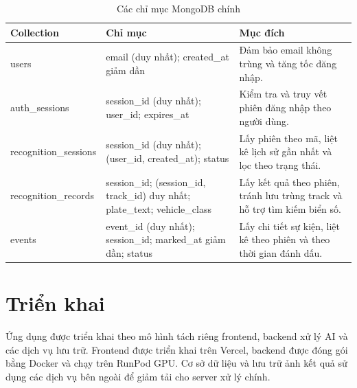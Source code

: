 \documentclass[../DoAn.tex]{subfiles}
\begin{document}
\begin{table}[htbp]
\centering
\caption{Các chỉ mục MongoDB chính}
\label{tab:mongodb-indexes}
\renewcommand{\arraystretch}{1.15}
\begin{tabular}{|>{\raggedright\arraybackslash}p{3.2cm}|>{\raggedright\arraybackslash}p{4.8cm}|>{\raggedright\arraybackslash}p{6.2cm}|}
\hline
\textbf{Collection} & \textbf{Chỉ mục} & \textbf{Mục đích} \\
\hline
users & email (duy nhất); created\_at giảm dần & Đảm bảo email không trùng và tăng tốc đăng nhập. \\
\hline
auth\_sessions & session\_id (duy nhất); user\_id; expires\_at & Kiểm tra và truy vết phiên đăng nhập theo người dùng. \\
\hline
recognition\_sessions & session\_id (duy nhất); (user\_id, created\_at); status & Lấy phiên theo mã, liệt kê lịch sử gần nhất và lọc theo trạng thái. \\
\hline
recognition\_records & session\_id; (session\_id, track\_id) duy nhất; plate\_text; vehicle\_class & Lấy kết quả theo phiên, tránh lưu trùng track và hỗ trợ tìm kiếm biển số. \\
\hline
events & event\_id (duy nhất); session\_id; marked\_at giảm dần; status & Lấy chi tiết sự kiện, liệt kê theo phiên và theo thời gian đánh dấu. \\
\hline
\end{tabular}
\end{table}

\section{Triển khai}
\label{section:4.4}

Ứng dụng được triển khai theo mô hình tách riêng frontend, backend xử lý AI và các dịch vụ lưu trữ. Frontend được triển khai trên Vercel, backend được đóng gói bằng Docker và chạy trên RunPod GPU. Cơ sở dữ liệu và lưu trữ ảnh kết quả sử dụng các dịch vụ bên ngoài để giảm tải cho server xử lý chính.
\end{document}
